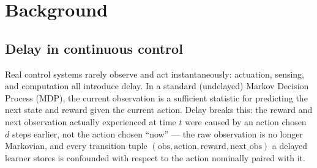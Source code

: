 \documentclass[11pt]{article}
\begin{document}
\begin{abstract}
\textbf{Full-data replication on Pendulum-v1 found TRM significantly worse than DNN (6/6 seed-pairs, one-sided sign test $p=0.016$), not merely tied --- a materially different picture than the informal pilot suggested.} On MountainCarContinuous-v0, that gap closed to a statistical tie (3/6 pairs, $p=0.66$ vs.\ DNN; 4/6 pairs, $p=0.34$ vs.\ Transformer): directionally consistent with the pre-registered threshold prediction, but not significant. On BipedalWalker-v3 --- a second, independent complexity axis --- \textbf{no architecture pairing, TRM-variant pairing, or augmentation-condition pairing reached significance in either direction} (best case 2/3 or 3/3 sign agreement at $n=3$, $p \geq 0.125$). Across all three environments and every comparison run, \textbf{exactly one result reaches statistical significance: the TRM deficit on Pendulum-v1.} TRM's wall-clock overhead relative to DNN grew at every rung tested (7.0x $\to$ 14.1x $\to$ 5.2x--8.0x, the last on different hardware; see \S\ref{sec:limitations}), so its cost scaled up at least as fast as any undetected benefit. We report the general complexity-scaling hypothesis as disconfirmed across the two axes tested, and identify one candidate signal in the augmentation ablation --- not itself a finding --- as the most promising direction for a targeted, adequately powered follow-up (\S\ref{sec:nextsteps}).
\end{abstract}

\section{Background}

\subsection{Delay in continuous control}

Real control systems rarely observe and act instantaneously: actuation, sensing, and computation all introduce delay. In a standard (undelayed) Markov Decision Process (MDP), the current observation is a sufficient statistic for predicting the next state and reward given the current action. Delay breaks this: the reward and next observation actually experienced at time $t$ were caused by an action chosen $d$ steps earlier, not the action chosen ``now'' --- the raw observation is no longer Markovian, and every transition tuple $(\text{obs}, \text{action}, \text{reward}, \text{next\_obs})$ a delayed learner stores is confounded with respect to the action nominally paired with it.
\end{document}
